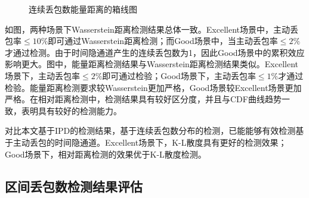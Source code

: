 {	\begin{figure}[htb]
        \centering
        \caption{连续丢包数能量距离的箱线图}
        \label{fig:3:result:burst:ed}
	\end{figure}
}

如图，两种场景下Wasserstein距离检测结果总体一致。Excellent场景中，主动丢包率$\le 10\%$即可通过Wasserstein距离检测；而Good场景中，当主动丢包率$\le 2\%$才通过检测。由于时间隐通道产生的连续丢包数为1，因此Good场景中的累积效应影响更大。图中，能量距离检测结果与Wasserstein距离检测结果类似。Excellent场景下，主动丢包率$\le 2\%$即可通过检验；Good场景下，主动丢包率$\le 1\%$才通过检验。能量距离检测要求较Wasserstein更加严格，Good场景较Excellent场景更加严格。在相对距离检测中，检测结果具有较好区分度，并且与CDF曲线趋势一致，表明具有较好的检测能力。

对比本文基于IPD的检测结果，基于连续丢包数分布的检测，已能能够有效检测基于主动丢包的时间隐通道。Excellent场景下，K-L散度具有更好的检测效果；Good场景下，相对距离检测的效果优于K-L散度检测。

\subsection{区间丢包数检测结果评估}
\label{chap:analyze:result:window}

